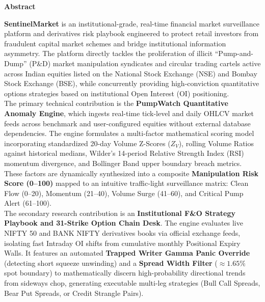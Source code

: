 \begin{center}
{\LARGE \textbf{Abstract}}\\[1.2cm]
\end{center}

\noindent \textbf{SentinelMarket} is an institutional-grade, real-time financial market surveillance platform and derivatives risk playbook engineered to protect retail investors from fraudulent capital market schemes and bridge institutional information asymmetry. The platform directly tackles the proliferation of illicit ``Pump-and-Dump'' (P\&D) market manipulation syndicates and circular trading cartels active across Indian equities listed on the National Stock Exchange (NSE) and Bombay Stock Exchange (BSE), while concurrently providing high-conviction quantitative options strategies based on institutional Open Interest (OI) positioning.\\[0.4cm]

\noindent The primary technical contribution is the \textbf{PumpWatch Quantitative Anomaly Engine}, which ingests real-time tick-level and daily OHLCV market feeds across benchmark and user-configured equities without external database dependencies. The engine formulates a multi-factor mathematical scoring model incorporating standardized 20-day Volume Z-Scores ($Z_V$), rolling Volume Ratios against historical medians, Wilder's 14-period Relative Strength Index (RSI) momentum divergence, and Bollinger Band upper boundary breach metrics. These factors are dynamically synthesized into a composite \textbf{Manipulation Risk Score (0--100)} mapped to an intuitive traffic-light surveillance matrix: Clean Flow (0--20), Momentum (21--40), Volume Surge (41--60), and Critical Pump Alert (61--100).\\[0.4cm]

\noindent The secondary research contribution is an \textbf{Institutional F\&O Strategy Playbook and 31-Strike Option Chain Desk}. The engine evaluates live NIFTY 50 and BANK NIFTY derivatives books via official exchange feeds, isolating fast Intraday OI shifts from cumulative monthly Positional Expiry Walls. It features an automated \textbf{Trapped Writer Gamma Panic Override} (detecting short squeeze unwinding) and a \textbf{Spread Width Filter} ($\approx 1.65\%$ spot boundary) to mathematically discern high-probability directional trends from sideways chop, generating executable multi-leg strategies (Bull Call Spreads, Bear Put Spreads, or Credit Strangle Pairs).\\[0.4cm]

